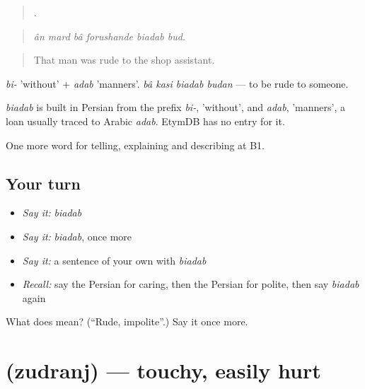 \begin{quote}
     .
\end{quote}

\begin{quote}
\emph{ân mard bâ forushande biadab bud.}
\end{quote}

\begin{quote}
That man was rude to the shop assistant.
\end{quote}

\emph{bi-} 'without' + \emph{adab} 'manners'. \emph{bâ kasi biadab budan} — to be rude to someone.

\begin{cousinweb}
\emph{biadab} is built in Persian from the prefix \emph{bi-}, 'without', and \emph{adab}, 'manners', a loan usually traced to Arabic \emph{adab}. EtymDB has no entry for it.
\end{cousinweb}

\begin{grammarlens}[title={What you've built}]
One more word for telling, explaining and describing at B1.
\end{grammarlens}

\subsection*{Your turn}
\begin{itemize}
\raggedright
  \item \emph{Say it:} \emph{biadab}
  \item \emph{Say it:} \emph{biadab}, once more
  \item \emph{Say it:} a sentence of your own with \emph{biadab}
  \item \emph{Recall:} say the Persian for caring, then the Persian for polite, then say \emph{biadab} again
\end{itemize}

\begin{tcolorbox}[breakable,colback=teal!4,colframe=teal!35!black,title={Before you move on}]
What does  mean? (\textquotedblleft{}Rude, impolite\textquotedblright{}.) Say it once more.
\end{tcolorbox}
\section[\texorpdfstring{\fa{زودرنج} (zudranj)}{زودرنج (zudranj)}]{ (zudranj) — touchy, easily hurt}

